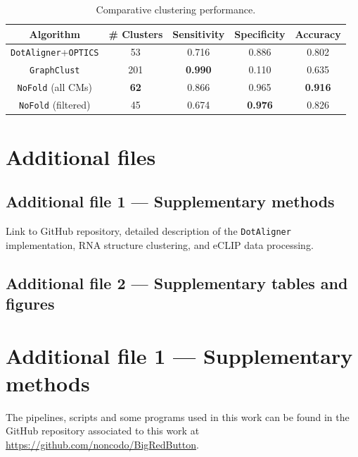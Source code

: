\documentclass{bmcart}
\newcommand\dotaligner{\texttt{DotAligner}}
\newcommand\nofold{\texttt{NoFold}}
\begin{document}
\begin{backmatter}
\begin{table}[h!]
\caption{ Comparative clustering performance. }
 \begin{tabular}{ccccc}
 \hline
 Algorithm & \# Clusters & Sensitivity & Specificity & Accuracy \\
 \hline
 \dotaligner{}+\texttt{OPTICS} & 53 & 0.716 & 0.886& 0.802\\
 \texttt{GraphClust} & 201 & \textbf{0.990} & 0.110 & 0.635\\ %
 \nofold{} (all CMs) & \textbf{62} & 0.866 & 0.965 & \textbf{0.916 }\\ %
 \nofold{} (filtered) & 45 & 0.674 & \textbf{0.976} & 0.826\\ %
 \hline
 \end{tabular}
\end{table}




\section*{Additional files}

 \subsection*{Additional file 1 --- Supplementary methods}

 Link to GitHub repository, detailed description of the \dotaligner{} implementation, RNA structure clustering, and eCLIP data processing. 

 \subsection*{Additional file 2 --- Supplementary tables and figures}

\end{backmatter}

\clearpage

\section*{Additional file 1 --- Supplementary methods}
The pipelines, scripts and some programs used in this work can be found in the 
GitHub repository associated to this work at \url{https://github.com/noncodo/BigRedButton}. 
\end{document}
